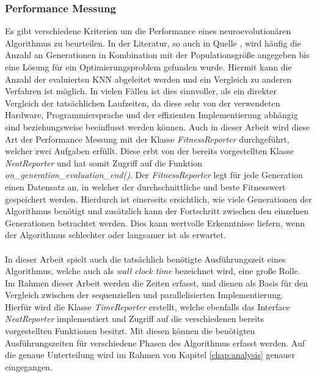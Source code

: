 \subsubsection{Performance Messung}
Es gibt verschiedene Kriterien um die Performance eines neuroevolutionären Algorithmus zu beurteilen. In der Literatur, so auch in Quelle \cite{stanley2002evolving}, wird häufig die Anzahl an Generationen in Kombination mit der Populationsgröße angegeben bis eine Lösung für ein Optimierungsproblem gefunden wurde. 
Hiermit kann die Anzahl der evaluierten \ac{KNN} abgeleitet werden und ein Vergleich zu anderen Verfahren ist möglich. In vielen Fällen ist dies sinnvoller, als ein direkter Vergleich der tatsächlichen Laufzeiten, da diese sehr von der verwendeten Hardware, Programmiersprache und der effizienten Implementierung abhängig sind beziehungsweise beeinflusst werden können. Auch in dieser Arbeit wird diese Art der Performance Messung mit der Klasse \emph{FitnessReporter} durchgeführt, welcher zwei Aufgaben erfüllt. Diese erbt von der bereits vorgestellten Klasse \emph{NeatReporter} und hat somit Zugriff auf die Funktion \emph{on\_generation\_evaluation\_end()}. Der \emph{FitnessReporter} legt für jede Generation einen Datensatz an, in welcher der durchschnittliche und beste Fitnesswert gespeichert werden. Hierdurch ist einerseits ersichtlich, wie viele Generationen der Algorithmus benötigt und zusätzlich kann der Fortschritt zwischen den einzelnen Generationen betrachtet werden. Dies kann wertvolle Erkenntnisse liefern, wenn der Algorithmus schlechter oder langsamer ist als erwartet. 
\\\\
In dieser Arbeit spielt auch die tatsächlich benötigte Ausführungszeit eines Algorithmus, welche auch als \emph{wall clock time} bezeichnet wird, eine große Rolle. Im Rahmen dieser Arbeit werden die Zeiten erfasst, und dienen als Basis für den Vergleich zwischen der sequenziellen und parallelisierten Implementierung. Hierfür wird die Klasse \emph{TimeReporter} erstellt, welche ebenfalls das Interface \emph{NeatReporter} implementiert und Zugriff auf die verschiedenen bereits vorgestellten Funktionen besitzt. Mit diesen können die benötigten Ausführungszeiten für verschiedene Phasen des Algorithmus erfasst werden. Auf die genaue Unterteilung wird im Rahmen von Kapitel \ref{chap:analysis} genauer eingegangen. 

